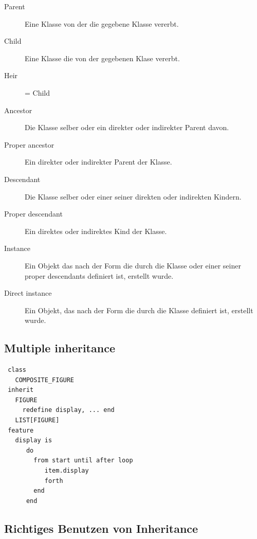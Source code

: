 \documentclass[german, 10pt, a4paper, twocolumn]{scrartcl}
\theoremstyle{definition}
\begin{document}
\begin{description}
	\item[Parent] Eine Klasse von der die gegebene Klasse vererbt.
	\item[Child] Eine Klasse die von der gegebenen Klase vererbt.
	\item[Heir] = Child
	\item[Ancestor] Die Klasse selber oder ein direkter oder indirekter Parent davon.
	\item[Proper ancestor] Ein direkter oder indirekter Parent der Klasse.
	\item[Descendant] Die Klasse selber oder einer seiner direkten oder indirekten Kindern.
	\item[Proper descendant] Ein direktes oder indirektes Kind der Klasse.
	\item[Instance] Ein Objekt das nach der Form die durch die Klasse oder einer seiner proper descendants definiert ist, erstellt wurde.
	\item[Direct instance] Ein Objekt, das nach der Form die durch die Klasse definiert ist, erstellt wurde.
\end{description}

\subsection{Multiple inheritance}

\begin{verbatim}
 class
   COMPOSITE_FIGURE
 inherit
   FIGURE
     redefine display, ... end
   LIST[FIGURE]
 feature
   display is
      do
        from start until after loop
           item.display
           forth
        end
      end
\end{verbatim}



\subsection{Richtiges Benutzen von Inheritance}
\end{document}
